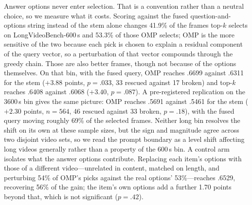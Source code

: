 \documentclass[11pt]{article}
\begin{document}
Answer options never enter selection.
That is a convention rather than a neutral choice, so we measure what it costs.
Scoring against the fused question-and-options string instead of the stem alone changes 41.9\% of the frames top-$k$ selects on LongVideoBench-600\,s and 53.3\% of those OMP selects; OMP is the more sensitive of the two because each pick is chosen to explain a residual component of the query vector, so a perturbation of that vector compounds through the greedy chain.
Those are also better frames, though not because of the options themselves.
On that bin, with the fused query, OMP reaches .6699 against .6311 for the stem (${+}3.88$ points, $p{=}.033$, 33 rescued against 17 broken) and top-$k$ reaches .6408 against .6068 (${+}3.40$, $p{=}.087$).
A pre-registered replication on the 3600\,s bin gives the same picture: OMP reaches .5691 against .5461 for the stem (${+}2.30$ points, $n{=}564$, 46 rescued against 33 broken, $p{=}.18$), with the fused query moving roughly 69\% of the selected frames.
Neither long bin resolves the shift on its own at these sample sizes, but the sign and magnitude agree across two disjoint video sets, so we read the prompt boundary as a level shift affecting long videos generally rather than a property of the 600\,s bin.
A control arm isolates what the answer options contribute.
Replacing each item's options with those of a different video---unrelated in content, matched on length, and perturbing 54\% of OMP's picks against the real options' 53\%---reaches .6529, recovering 56\% of the gain; the item's own options add a further 1.70 points beyond that, which is not significant ($p{=}.42$).
\end{document}
